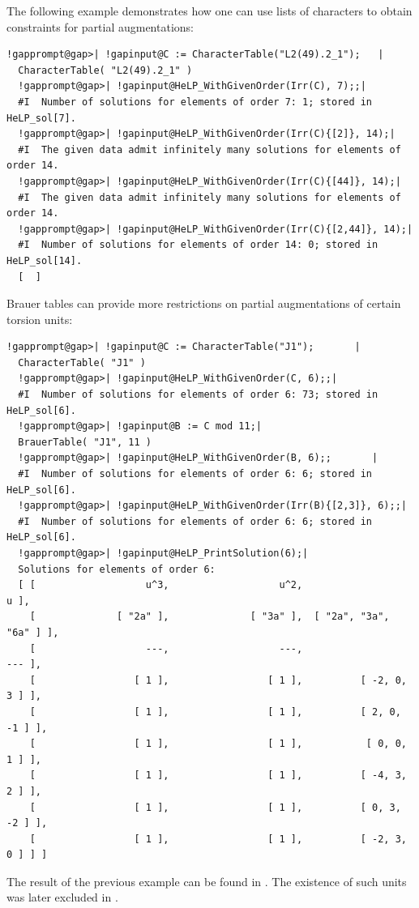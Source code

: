 \documentclass[a4paper,11pt]{report}
\begin{document}
{{\begin{Verbatim}[commandchars=!@|,fontsize=\small,frame=single,label=Example]
\end{Verbatim}
 The following example demonstrates how one can use lists of characters to
obtain constraints for partial augmentations: 
\begin{Verbatim}[commandchars=!@|,fontsize=\small,frame=single,label=Example]
  !gapprompt@gap>| !gapinput@C := CharacterTable("L2(49).2_1");   |
  CharacterTable( "L2(49).2_1" )
  !gapprompt@gap>| !gapinput@HeLP_WithGivenOrder(Irr(C), 7);;|
  #I  Number of solutions for elements of order 7: 1; stored in HeLP_sol[7].
  !gapprompt@gap>| !gapinput@HeLP_WithGivenOrder(Irr(C){[2]}, 14);|
  #I  The given data admit infinitely many solutions for elements of order 14.
  !gapprompt@gap>| !gapinput@HeLP_WithGivenOrder(Irr(C){[44]}, 14);|
  #I  The given data admit infinitely many solutions for elements of order 14.
  !gapprompt@gap>| !gapinput@HeLP_WithGivenOrder(Irr(C){[2,44]}, 14);|
  #I  Number of solutions for elements of order 14: 0; stored in HeLP_sol[14].
  [  ]
\end{Verbatim}
 Brauer tables can provide more restrictions on partial augmentations of
certain torsion units: 
\begin{Verbatim}[commandchars=!@|,fontsize=\small,frame=single,label=Example]
  !gapprompt@gap>| !gapinput@C := CharacterTable("J1");       |
  CharacterTable( "J1" )
  !gapprompt@gap>| !gapinput@HeLP_WithGivenOrder(C, 6);;|
  #I  Number of solutions for elements of order 6: 73; stored in HeLP_sol[6].
  !gapprompt@gap>| !gapinput@B := C mod 11;|
  BrauerTable( "J1", 11 )
  !gapprompt@gap>| !gapinput@HeLP_WithGivenOrder(B, 6);;       |
  #I  Number of solutions for elements of order 6: 6; stored in HeLP_sol[6].
  !gapprompt@gap>| !gapinput@HeLP_WithGivenOrder(Irr(B){[2,3]}, 6);;|
  #I  Number of solutions for elements of order 6: 6; stored in HeLP_sol[6].
  !gapprompt@gap>| !gapinput@HeLP_PrintSolution(6);|
  Solutions for elements of order 6:
  [ [                   u^3,                   u^2,                     u ],
    [              [ "2a" ],              [ "3a" ],  [ "2a", "3a", "6a" ] ],
    [                   ---,                   ---,                   --- ],
    [                 [ 1 ],                 [ 1 ],          [ -2, 0, 3 ] ],
    [                 [ 1 ],                 [ 1 ],          [ 2, 0, -1 ] ],
    [                 [ 1 ],                 [ 1 ],           [ 0, 0, 1 ] ],
    [                 [ 1 ],                 [ 1 ],          [ -4, 3, 2 ] ],
    [                 [ 1 ],                 [ 1 ],          [ 0, 3, -2 ] ],
    [                 [ 1 ],                 [ 1 ],          [ -2, 3, 0 ] ] ]
\end{Verbatim}
 The result of the previous example can be found in \cite{BJK}. The existence of such units was later excluded in \cite{BachleMargolisExamplesToMethods}. 

}}
\end{document}
